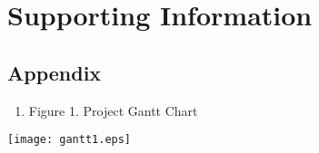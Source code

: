 \documentclass[10pt, onecolumn, draftclsnofoot, letterpaper, compsoc]{IEEEtran}
\begin{document}
\newpage
\section{Supporting Information}

\subsection{Appendix}

\begin{enumerate}
	\item Figure 1. Project Gantt Chart
\end{enumerate}

\begin{center}
	\texttt{[image: gantt1.eps]}
\end{center}
\end{document}
